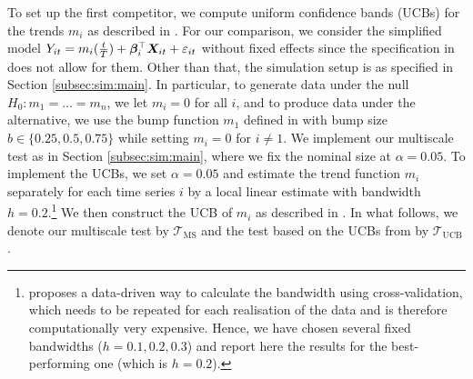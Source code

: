\documentclass[12pt]{article}
\makeatletter
\renewcommand{\eqref}[1]{\tagform@{\ref{#1}}}
\makeatother
\begin{document}
To set up the first competitor, we compute uniform confidence bands (UCBs) for the trends $m_i$ as described in \cite{Kim2016}. For our comparison, we consider the simplified model $Y_{it} = m_i(\frac{t}{T}) + \bm{\beta}_i^\top \boldsymbol{X}_{it} +  \varepsilon_{it}$ without fixed effects since the specification in \cite{Kim2016} does not allow for them. Other than that, the simulation setup is as specified in Section \ref{subsec:sim:main}. 
In particular, to generate data under the null $H_0: m_1 = \ldots = m_n$, we let $m_i = 0$ for all $i$, and to produce data under the alternative, we use the bump function $m_1$ defined in \eqref{eq:bump-fct} with bump size $b \in \{ 0.25, 0.5, 0.75 \}$ while setting $m_i = 0$ for $i \ne 1$.
We implement our multiscale test as in Section \ref{subsec:sim:main}, where we fix the nominal size at $\alpha = 0.05$. To implement the UCBs, we set $\alpha = 0.05$ and estimate the trend function $m_i$ separately for each time series $i$ by a local linear estimate with bandwidth $h = 0.2$.\footnote{\cite{Kim2016} proposes a data-driven way to calculate the bandwidth using cross-validation, which needs to be repeated for each realisation of the data and is  therefore computationally very expensive. Hence, we have chosen several fixed bandwidths ($h = 0.1, 0.2, 0.3$) and report here the results for the best-performing one (which is $h=0.2$).} We then construct the UCB of $m_i$ as described in \cite{Kim2016}. In what follows, we denote our multiscale test by $\mathcal{T}_{\text{MS}}$ and the test based on the UCBs from \cite{Kim2016} by $\mathcal{T}_{\text{UCB}}$. 
\end{document}
